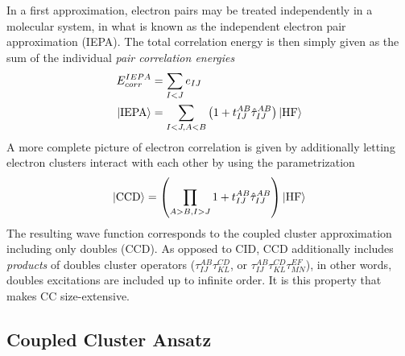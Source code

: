 In a first approximation, electron pairs may be treated independently in a molecular system, in what is known as the independent electron pair approximation (IEPA). The total correlation energy is then simply given as the sum of the individual \emph{pair correlation energies}
\begin{align}
E_{corr}^{IEPA} &= \sum_{I < J} e_{IJ}  \\
\ket{\textrm{IEPA}} &= \sum_{I < J, A < B} \left(1 + t_{IJ}^{AB}\hat{\tau}_{IJ}^{AB} \right) \ket{\text{HF}} 
\end{align}
\noindent A more complete picture of electron correlation is given by additionally letting electron clusters interact with each other by using the parametrization
\begin{equation}
\ket{\textrm{CCD}} = \left( \prod_{A > B,I > J} 1 + t_{IJ}^{AB}\hat{\tau}_{IJ}^{AB} \right) \ket{\text{HF}}
\end{equation}
\noindent The resulting wave function corresponds to the coupled cluster approximation including only doubles (CCD). As opposed to CID, CCD additionally includes \emph{products} of doubles cluster operators ($\tau_{IJ}^{AB} \tau_{KL}^{CD}$, or $\tau_{IJ}^{AB} \tau_{KL}^{CD} \tau_{MN}^{EF}$), in other words, doubles excitations are included up to infinite order. It is this property that makes CC size-extensive.


\subsection{Coupled Cluster Ansatz}

